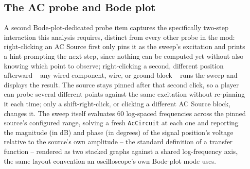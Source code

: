 \subsection{The AC probe and Bode plot}

A second Bode-plot-dedicated probe item captures the specifically two-step interaction this
analysis requires, distinct from every other probe in the mod: right-clicking an AC Source first
only pins it as the sweep's excitation and prints a hint prompting the next step, since nothing
can be computed yet without also knowing which point to observe; right-clicking a second,
different position afterward -- any wired component, wire, or ground block -- runs the sweep and
displays the result. The source stays pinned after that second click, so a player can probe
several different points against the same excitation without re-pinning it each time; only a
shift-right-click, or clicking a different AC Source block, changes it. The sweep itself
evaluates 60 log-spaced frequencies across the pinned source's configured range, solving a fresh
\texttt{AcCircuit} at each one and reporting the magnitude (in dB) and phase (in degrees) of the
signal position's voltage relative to the source's own amplitude -- the standard definition of a
transfer function -- rendered as two stacked graphs against a shared log-frequency axis, the
same layout convention an oscilloscope's own Bode-plot mode uses.
